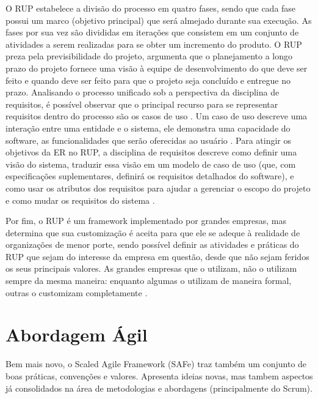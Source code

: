 O RUP estabelece a divisão do processo em quatro fases, sendo que cada fase possui um marco (objetivo principal) que será almejado durante sua execução. As fases por sua vez são divididas em iterações que consistem em um conjunto de atividades a serem realizadas para se obter um incremento do produto. O RUP preza pela previsibilidade do projeto, argumenta que o planejamento a longo prazo do projeto fornece uma visão à equipe de desenvolvimento do que deve ser feito e quando deve ser feito para que o projeto seja concluído e entregue no prazo. Analisando o processo unificado sob a perspectiva da disciplina de requisitos, é possível observar que o principal recurso para se representar requisitos dentro do processo são os casos de uso \cite{kruchten001}. Um caso de uso descreve uma interação entre uma entidade e o sistema, ele demonstra uma capacidade do software, as funcionalidades que serão oferecidas ao usuário \cite{kruchten003}. Para atingir os objetivos da ER no RUP, a disciplina de requisitos descreve como definir uma visão do sistema, traduzir essa visão em um modelo de caso de uso (que, com especificações suplementares, definirá os requisitos detalhados do software), e como usar os atributos dos requisitos para ajudar a gerenciar o escopo do projeto e como mudar os requisitos do sistema \cite{kruchten004}.


Por fim, o RUP é um framework implementado por grandes empresas, mas determina que sua customização é aceita para que ele se adeque à realidade de organizações  de menor porte, sendo possível definir as atividades e práticas do RUP que sejam do interesse da empresa em questão, desde que não sejam feridos os seus principais valores. As grandes empresas que o utilizam, não o utilizam sempre da mesma maneira: enquanto algumas o utilizam de maneira formal, outras o customizam completamente \cite{kruchten005}.

\section{Abordagem Ágil}
Bem mais novo, o Scaled Agile Framework (SAFe) traz também um conjunto de boas práticas, convenções e valores. Apresenta ideias novas, mas tambem aspectos já consolidados na área de metodologias e abordagens (principalmente do Scrum).

